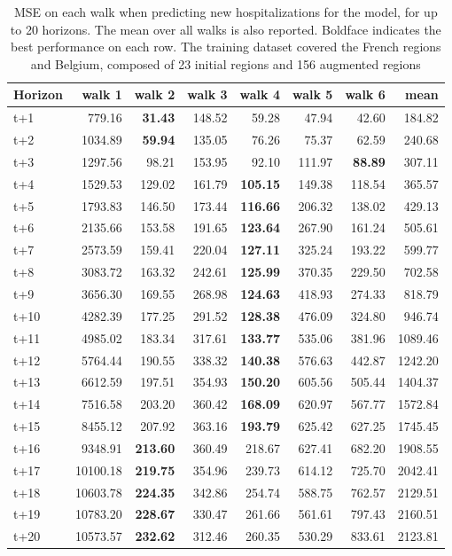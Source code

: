 \begin{table}[H]
\centering
\caption{MSE on each walk when predicting new hospitalizations for the model, for up to 20 horizons. The mean over all walks is also reported. Boldface indicates the best performance on each row. The training dataset covered the French regions and Belgium, composed of 23 initial regions and 156 augmented regions }
\label{tab:MSE_walk_encoder_decoder}
\begin{tabular}{lrrrrrrr}
\toprule
Horizon &   walk 1 &  walk 2 &  walk 3 &  walk 4 &  walk 5 &  walk 6 &    mean \\
\midrule
t+1  & 779.16  & \textbf{31.43}  & 148.52  & 59.28  & 47.94  & 42.60  & 184.82  \\
t+2  & 1034.89  & \textbf{59.94}  & 135.05  & 76.26  & 75.37  & 62.59  & 240.68  \\
t+3  & 1297.56  & 98.21  & 153.95  & 92.10  & 111.97  & \textbf{88.89}  & 307.11  \\
t+4  & 1529.53  & 129.02  & 161.79  & \textbf{105.15}  & 149.38  & 118.54  & 365.57  \\
t+5  & 1793.83  & 146.50  & 173.44  & \textbf{116.66}  & 206.32  & 138.02  & 429.13  \\
t+6  & 2135.66  & 153.58  & 191.65  & \textbf{123.64}  & 267.90  & 161.24  & 505.61  \\
t+7  & 2573.59  & 159.41  & 220.04  & \textbf{127.11}  & 325.24  & 193.22  & 599.77  \\
t+8  & 3083.72  & 163.32  & 242.61  & \textbf{125.99}  & 370.35  & 229.50  & 702.58  \\
t+9  & 3656.30  & 169.55  & 268.98  & \textbf{124.63}  & 418.93  & 274.33  & 818.79  \\
t+10  & 4282.39  & 177.25  & 291.52  & \textbf{128.38}  & 476.09  & 324.80  & 946.74  \\
t+11  & 4985.02  & 183.34  & 317.61  & \textbf{133.77}  & 535.06  & 381.96  & 1089.46  \\
t+12  & 5764.44  & 190.55  & 338.32  & \textbf{140.38}  & 576.63  & 442.87  & 1242.20  \\
t+13  & 6612.59  & 197.51  & 354.93  & \textbf{150.20}  & 605.56  & 505.44  & 1404.37  \\
t+14  & 7516.58  & 203.20  & 360.42  & \textbf{168.09}  & 620.97  & 567.77  & 1572.84  \\
t+15  & 8455.12  & 207.92  & 363.16  & \textbf{193.79}  & 625.42  & 627.25  & 1745.45  \\
t+16  & 9348.91  & \textbf{213.60}  & 360.49  & 218.67  & 627.41  & 682.20  & 1908.55  \\
t+17  & 10100.18  & \textbf{219.75}  & 354.96  & 239.73  & 614.12  & 725.70  & 2042.41  \\
t+18  & 10603.78  & \textbf{224.35}  & 342.86  & 254.74  & 588.75  & 762.57  & 2129.51  \\
t+19  & 10783.20  & \textbf{228.67}  & 330.47  & 261.66  & 561.61  & 797.43  & 2160.51  \\
t+20  & 10573.57  & \textbf{232.62}  & 312.46  & 260.35  & 530.29  & 833.61  & 2123.81  \\

\bottomrule
\end{tabular}
\end{table}
